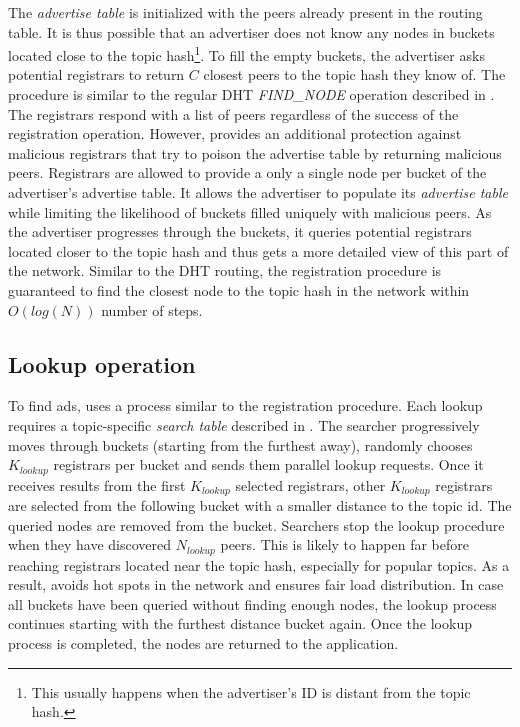 The \emph{advertise table} is initialized with the peers already present in the routing table. It is thus possible that an advertiser does not know any nodes in buckets located close to the topic hash\footnote{This usually happens when the advertiser's ID is distant from the topic hash.}. 
To fill the empty buckets, the advertiser asks potential registrars to return $C$ closest peers to the topic hash they know of. 
The procedure is similar to the regular DHT \emph{FIND\_NODE} operation described in . The registrars respond with a list of peers regardless of the success of the registration operation. However, \sysname provides an additional protection against malicious registrars that try to poison the advertise table by returning malicious peers. Registrars are allowed to provide a only a single node per bucket of the advertiser's advertise table. It allows the advertiser to populate its \emph{advertise table} while limiting the likelihood of buckets filled uniquely with malicious peers.
As the advertiser progresses through the buckets, it queries potential registrars located closer to the topic hash and thus gets a more detailed view of this part of the network. 
Similar to the DHT routing, the registration procedure is guaranteed to find the closest node to the topic hash in the network within $O(log(N))$ number of steps. 

\subsection{Lookup operation}\label{sec:lookup}
To find ads, \sysname uses a process similar to the registration procedure. 
Each lookup requires a topic-specific \emph{search table} described in .
The searcher progressively moves through buckets (starting from the furthest away), randomly chooses $K_\textit{lookup}$ registrars per bucket and sends them parallel lookup requests. 
Once it receives results from the first $K_\textit{lookup}$ selected registrars, other $K_\textit{lookup}$ registrars are selected from the following bucket with a smaller distance to the topic id.
The queried nodes are removed from the bucket.
Searchers stop the lookup procedure when they have discovered $N_\textit{lookup}$ peers. This is likely to happen far before reaching registrars located near the topic hash, especially for popular topics. As a result, \sysname avoids hot spots in the network and ensures fair load distribution. 
In case all buckets have been queried without finding enough nodes, the lookup process continues starting with the furthest distance bucket again. 
Once the lookup process is completed, the nodes are returned to the application.

